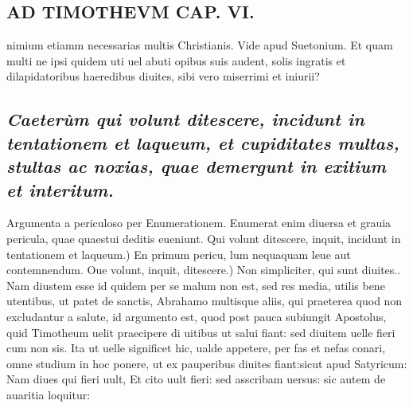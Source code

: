 \documentclass{article}
\begin{document}
\begin{pages}
\section*{AD TIMOTHEVM CAP. VI. }
\marginpar{[ p.126 ]}\pstart nimium etiamm necessarias multis Christianis. Vide apud Suetonium. Et quam multi ne ipsi quidem uti uel abuti opibus suis audent, solis ingratis et dilapidatoribus haeredibus diuites, sibi vero miserrimi et iniurii?  \pend
{}
{}
\subsection*{\textit{Caeterùm qui volunt ditescere, incidunt in tentationem et laqueum, et cupiditates multas, stultas ac noxias, quae demergunt in exitium et interitum. }}\pstart Argumenta a periculoso per Enumerationem. Enumerat enim diuersa et grauia pericula, quae quaestui deditis eueniunt.  \pend\pstart Qui volunt ditescere, inquit, incidunt in tentationem et laqueum.) En primum pericu, lum nequaquam leue aut contemnendum.  \pend\pstart Oue volunt, inquit, ditescere.) Non simpliciter, qui sunt diuites.. Nam diustem esse id quidem per se malum non est, sed res media, utilis bene utentibus, ut patet de sanctis, Abrahamo multisque aliis, qui praeterea quod non excludantur a salute, id argumento est, quod post pauca subiungit Apostolus, quid Timotheum uelit praecipere di uitibus ut salui fiant: sed diuitem uelle fieri cum non sis. Ita ut uelle significet hic, ualde appetere, per fas et nefas conari, omne studium in hoc ponere, ut ex pauperibus diuites fiant:sicut apud Satyricum: Nam diues qui fieri uult, Et cito uult fieri: sed asscribam uersus: sic autem de auaritia loquitur:  \pend
{}
{}

\end{pages}
\end{document}
